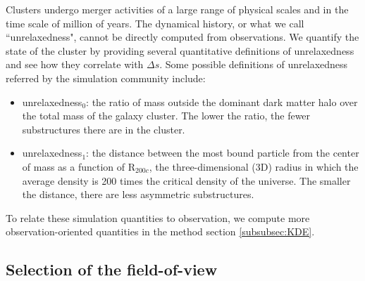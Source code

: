 Clusters undergo merger activities of a large range of physical scales and 
in the time scale of million of years. 
The dynamical history, or what we call ``unrelaxedness", cannot be directly 
computed from observations.
We quantify the state of the cluster by providing several quantitative
definitions of unrelaxedness and see how they correlate with $\Delta s$.
Some possible definitions of unrelaxedness referred by the simulation community
include:
\begin{itemize}
	\item unrelaxedness$_0$: the ratio of mass outside the dominant dark matter halo over the total mass
		of the galaxy cluster. The lower the ratio, the fewer substructures there
		are in the cluster. 
	\item unrelaxedness$_1$: the distance between the most bound particle from the center of mass as a
		function of R$_{200c}$, the three-dimensional (3D) radius in which the
		average density is 200 times the critical density of the universe. 
		The smaller the distance, there are less asymmetric 
		substructures. 
\end{itemize}
To relate these simulation quantities to observation, 
we compute more observation-oriented 
quantities in the method section \ref{subsubsec:KDE}. 

\subsection{Selection of the field-of-view}
\label{sec:FOV}

